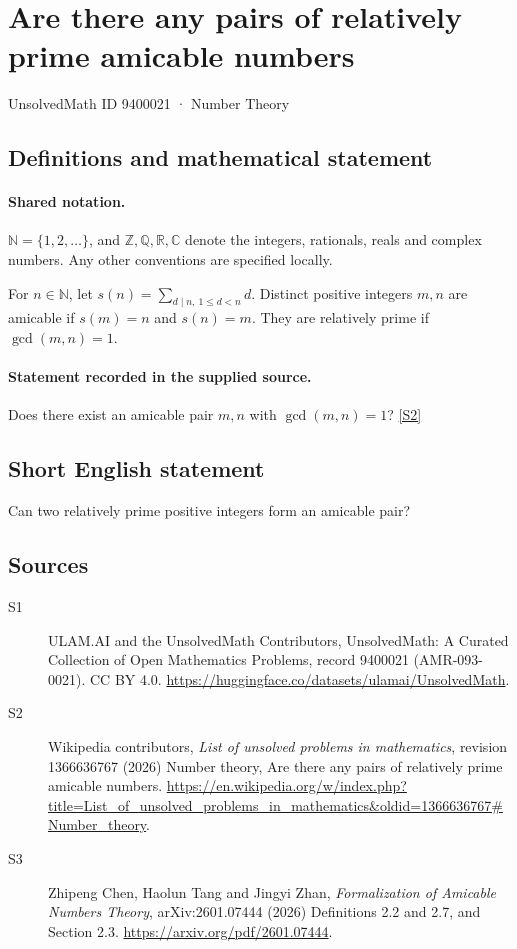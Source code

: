 \documentclass[11pt]{article}
\newcommand{\sref}[2]{\hyperlink{source:#1:#2}{[S#2]}}
\begin{document}
\setcounter{section}{9400020}
\section{Are there any pairs of relatively prime amicable numbers}\label{9400021}
{\small\sffamily UnsolvedMath ID 9400021 · Number Theory}
\subsection{Definitions and mathematical statement}

\paragraph{Shared notation.}$\mathbb N=\{1,2,\ldots\}$, and $\mathbb Z,\mathbb Q,\mathbb R,\mathbb C$ denote the integers, rationals, reals and complex numbers. Any other conventions are specified locally.


For $n\in\mathbb N$, let $s(n)=\sum_{d\mid n,\ 1\le d<n}d$. Distinct positive integers $m,n$ are amicable if $s(m)=n$ and $s(n)=m$. They are relatively prime if $\gcd(m,n)=1$.
\paragraph{Statement recorded in the supplied source.}
Does there exist an amicable pair $m,n$ with $\gcd(m,n)=1$? \sref{9400021}{2}
\subsection{Short English statement}
Can two relatively prime positive integers form an amicable pair?
\subsection{Sources}
\begin{description}
\item[\hypertarget{source:9400021:1}{S1}] ULAM.AI and the UnsolvedMath Contributors, UnsolvedMath: A Curated Collection of Open Mathematics Problems, record 9400021 (AMR-093-0021). CC BY 4.0. \url{https://huggingface.co/datasets/ulamai/UnsolvedMath}.
\item[\hypertarget{source:9400021:2}{S2}] Wikipedia contributors, \emph{List of unsolved problems in mathematics}, revision 1366636767 (2026) Number theory, Are there any pairs of relatively prime amicable numbers. \url{https://en.wikipedia.org/w/index.php?title=List_of_unsolved_problems_in_mathematics&oldid=1366636767#Number_theory}.
\item[\hypertarget{source:9400021:3}{S3}] Zhipeng Chen, Haolun Tang and Jingyi Zhan, \emph{Formalization of Amicable Numbers Theory}, arXiv:2601.07444 (2026) Definitions 2.2 and 2.7, and Section 2.3. \url{https://arxiv.org/pdf/2601.07444}.
\end{description}
\label{end:9400021}
\end{document}
